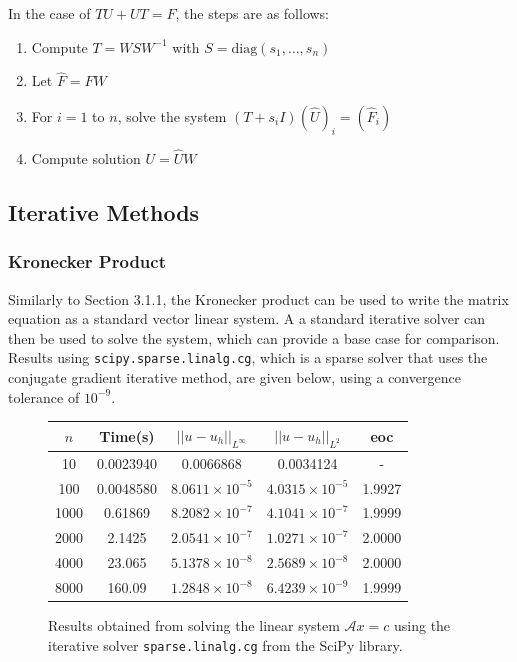 \documentclass{article}
\numberwithin{equation}{section}
\begin{document}
In the case of $TU + UT = F$, the steps are as follows:
\begin{enumerate}
\item Compute $T = WSW^{-1}$ with $S = \text{diag}(s_1, \dots, s_n)$
\item Let $\hat{F} = FW$
\item For $i=1$ to $n$, solve the system $(T+s_i I)(\hat{U})_i = (\hat{F}_i)$
\item Compute solution $U = \hat{U}W$
\end{enumerate}


\subsection{Iterative Methods}

\subsubsection{Kronecker Product}
Similarly to Section 3.1.1, the Kronecker product can be used to write the matrix equation as a standard vector linear system. A a standard iterative solver can then be used to solve the system, which can provide a base case for comparison. Results using \texttt{scipy.sparse.linalg.cg}, which is a sparse solver that uses the conjugate gradient iterative method, are given below, using a convergence tolerance of $10^{-9}$.

\begin{figure}[H]
\centering
\begin{tabular}{|c|c|c|c|c|}
\hline
$n$ & Time(s) & $|| u - u_h ||_{L^{\infty}}$ &$|| u - u_h ||_{L^{2}}$ & eoc \\
\hline
10 & 0.0023940 & 0.0066868 & 0.0034124 & - \\
100 & 0.0048580 & $8.0611 \times 10^{-5}$ & $4.0315 \times 10^{-5}$ & 1.9927 \\
1000 & 0.61869 & $8.2082 \times 10^{-7}$ & $4.1041 \times 10^{-7}$ & 1.9999 \\
2000 & 2.1425 & $2.0541 \times 10^{-7}$ & $1.0271 \times 10^{-7}$ & 2.0000 \\
4000 & 23.065 & $5.1378 \times 10^{-8}$ & $2.5689 \times 10^{-8}$ & 2.0000 \\
8000 & 160.09 & $1.2848 \times 10^{-8}$ & $6.4239 \times 10^{-9}$ & 1.9999 \\
\hline
\end{tabular}
\captionsetup{justification=centering}
\caption{Results obtained from solving the linear system $\mathcal{A} x = c$ using the iterative solver  \texttt{sparse.linalg.cg} from the SciPy library.}
\end{figure}
\end{document}
